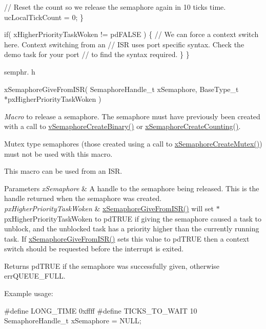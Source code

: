 \begin{DoxyPre}       // Reset the count so we release the semaphore again in 10 ticks time.
       ucLocalTickCount = 0;
   \}\end{DoxyPre}



\begin{DoxyPre}   if( xHigherPriorityTaskWoken != pdFALSE )
   \{
       // We can force a context switch here.  Context switching from an
       // ISR uses port specific syntax.  Check the demo task for your port
       // to find the syntax required.
   \}
  \}
  \end{DoxyPre}


semphr. h 
\begin{DoxyPre}
xSemaphoreGiveFromISR(
                         SemaphoreHandle\_t xSemaphore,
                         BaseType\_t *pxHigherPriorityTaskWoken
                     )\end{DoxyPre}


{\itshape Macro} to release a semaphore. The semaphore must have previously been created with a call to \hyperlink{vendor_2ceedling_2plugins_2freertos_2src_2freertos_2include_2semphr_8h_ae10bffadd26fbd5bcce76bf33a83ef30}{v\+Semaphore\+Create\+Binary()} or \hyperlink{vendor_2ceedling_2plugins_2freertos_2src_2freertos_2include_2semphr_8h_a7764616a918a46115403569a88148ad4}{x\+Semaphore\+Create\+Counting()}.

Mutex type semaphores (those created using a call to \hyperlink{vendor_2ceedling_2plugins_2freertos_2src_2freertos_2include_2semphr_8h_aa6a00aa9b91a9e5b3ebe4ae1c3f115c6}{x\+Semaphore\+Create\+Mutex()}) must not be used with this macro.

This macro can be used from an I\+SR.


\begin{DoxyParams}{Parameters}
{\em x\+Semaphore} & A handle to the semaphore being released. This is the handle returned when the semaphore was created.\\
\hline
{\em px\+Higher\+Priority\+Task\+Woken} & \hyperlink{vendor_2ceedling_2plugins_2freertos_2src_2freertos_2include_2semphr_8h_a68aa43df8b2a0dbe17d05fad74670ef0}{x\+Semaphore\+Give\+From\+I\+S\+R()} will set $\ast$px\+Higher\+Priority\+Task\+Woken to pd\+T\+R\+UE if giving the semaphore caused a task to unblock, and the unblocked task has a priority higher than the currently running task. If \hyperlink{vendor_2ceedling_2plugins_2freertos_2src_2freertos_2include_2semphr_8h_a68aa43df8b2a0dbe17d05fad74670ef0}{x\+Semaphore\+Give\+From\+I\+S\+R()} sets this value to pd\+T\+R\+UE then a context switch should be requested before the interrupt is exited.\\
\hline
\end{DoxyParams}
\begin{DoxyReturn}{Returns}
pd\+T\+R\+UE if the semaphore was successfully given, otherwise err\+Q\+U\+E\+U\+E\+\_\+\+F\+U\+LL.
\end{DoxyReturn}
Example usage\+: 
\begin{DoxyPre}
\#define LONG\_TIME 0xffff
\#define TICKS\_TO\_WAIT  10
SemaphoreHandle\_t xSemaphore = NULL;\end{DoxyPre}



